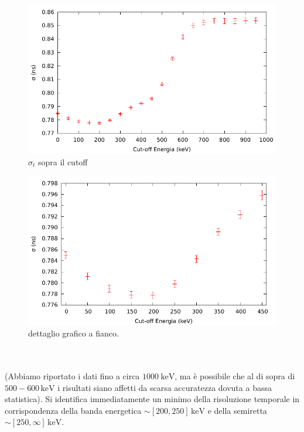 \documentclass[a4paper,11pt,italian]{report}
\begin{document}
~\\
\begin{minipage}{0.45\linewidth}
	\centering
	\begin{figure}[H]
	\includegraphics[width=\columnwidth,keepaspectratio]{../out/Cutoff}
	\caption{\small{$\sigma_t$ sopra il cutoff}}
	\end{figure}
\end{minipage}
\begin{minipage}{0.45\linewidth}
	\begin{figure}[H]
	\includegraphics[width=\columnwidth,keepaspectratio]{../out/Cutoff3}
	\caption{\small{dettaglio grafico a fianco.}}
	\end{figure}
\end{minipage}
~\\~\\
(Abbiamo riportato i dati fino a circa $\SI{1000}{\kilo\electronvolt}$, ma è possibile che al di sopra di $500-600\,\si{\kilo\electronvolt}$ i risultati siano affetti da scarsa accuratezza dovuta a bassa statistica). Si identifica immediatamente un minimo della risoluzione temporale in corrispondenza della banda energetica $\sim [200 , 250] \, \si{\kilo\electronvolt}$ e della semiretta $\sim [250 , \infty] \, \si{\kilo\electronvolt}$.
\end{document}
